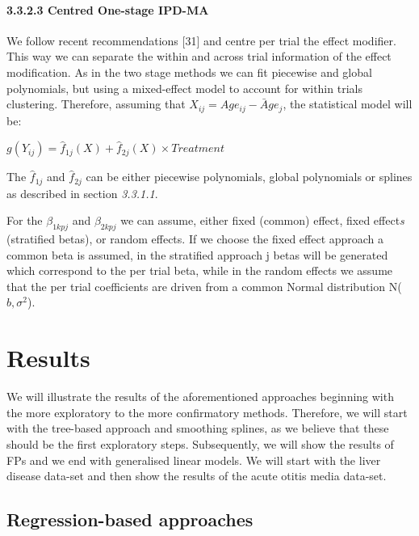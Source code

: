 \documentclass[14pt,]{article}
\let\oldparagraph\paragraph
\renewcommand{\paragraph}[1]{\oldparagraph{#1}\mbox{}}
\let\oldsubparagraph\subparagraph
\renewcommand{\subparagraph}[1]{\oldsubparagraph{#1}\mbox{}}
\begin{document}
\hypertarget{centred-one-stage-ipd-ma}{%
\paragraph{3.3.2.3 Centred One-stage
IPD-MA}\label{centred-one-stage-ipd-ma}}

We follow recent recommendations {[}31{]} and centre per trial the
effect modifier. This way we can separate the within and across trial
information of the effect modification. As in the two stage methods we
can fit piecewise and global polynomials, but using a mixed-effect model
to account for within trials clustering. Therefore, assuming that
\(X_{ij} = Age_{ij} - \bar Age_j\), the statistical model will be:

\(g(Y_{ij}) = \hat f_{1j}(X) + \hat f_{2j}(X) \times Treatment\)

The \(\hat f_{1j}\) and \(\hat f_{2j}\) can be either piecewise
polynomials, global polynomials or splines as described in section
\emph{3.3.1.1}.

For the \(\beta_{1kpj}\) and \(\beta_{2kpj}\) we can assume, either
fixed (common) effect, fixed effect\emph{s} (stratified betas), or
random effects. If we choose the fixed effect approach a common beta is
assumed, in the stratified approach j betas will be generated which
correspond to the per trial beta, while in the random effects we assume
that the per trial coefficients are driven from a common Normal
distribution N(\(b, \sigma^2\)).

\newpage

\hypertarget{section-1}{%
\subparagraph{}\label{section-1}}

\hypertarget{results-1}{%
\section{Results}\label{results-1}}

We will illustrate the results of the aforementioned approaches
beginning with the more exploratory to the more confirmatory methods.
Therefore, we will start with the tree-based approach and smoothing
splines, as we believe that these should be the first exploratory steps.
Subsequently, we will show the results of FPs and we end with
generalised linear models. We will start with the liver disease data-set
and then show the results of the acute otitis media data-set.

\hypertarget{regression-based-approaches-1}{%
\subsection{Regression-based
approaches}\label{regression-based-approaches-1}}
\end{document}
